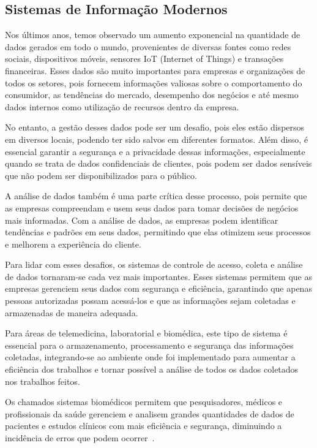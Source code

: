 \subsection{Sistemas de Informação Modernos}


Nos últimos anos, temos observado um aumento exponencial na quantidade de dados gerados em todo o mundo, provenientes de diversas fontes como redes sociais, dispositivos móveis, sensores IoT (Internet of Things) e transações financeiras.
Esses dados são muito importantes para empresas e organizações de todos os setores, pois fornecem informações valiosas sobre o comportamento do consumidor, as tendências do mercado, desempenho dos negócios e até mesmo dados internos como utilização de recursos dentro da empresa.

No entanto, a gestão desses dados pode ser um desafio, pois eles estão dispersos em diversos locais, podendo ter sido salvos em diferentes formatos. Além disso, é essencial garantir a segurança e a privacidade dessas informações, especialmente quando se trata de dados confidenciais de clientes, pois podem ser dados sensíveis que não podem ser disponibilizados para o público.

A análise de dados também é uma parte crítica desse processo, pois permite que as empresas compreendam e usem seus dados para tomar decisões de negócios mais informadas. Com a análise de dados, as empresas podem identificar tendências e padrões em seus dados, permitindo que elas otimizem seus processos e melhorem a experiência do cliente.

Para lidar com esses desafios, os sistemas de controle de acesso, coleta e análise de dados tornaram-se cada vez mais importantes. Esses sistemas permitem que as empresas gerenciem seus dados com segurança e eficiência, garantindo que apenas pessoas autorizadas possam acessá-los e que as informações sejam coletadas e armazenadas de maneira adequada.

Para áreas de telemedicina, laboratorial e biomédica, este tipo de sistema é essencial para o armazenamento, processamento e segurança das informações coletadas, integrando-se ao ambiente onde foi implementado para aumentar a eficiência dos trabalhos e tornar possível a análise de todos os dados coletados nos trabalhos feitos.

Os chamados sistemas biomédicos permitem que pesquisadores, médicos e profissionais da saúde gerenciem e analisem grandes quantidades de dados de pacientes e estudos clínicos com mais eficiência e segurança, diminuindo a incidência de erros que podem ocorrer~\cite{Sun2021LaboratoryEfficiency}.

